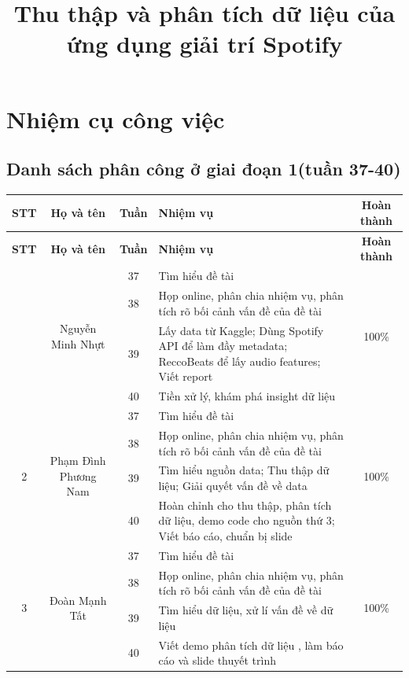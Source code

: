 \documentclass{../hcmut-report}
\title{Thu thập và phân tích dữ liệu của ứng dụng giải trí Spotify}
\begin{document}
\coverpage



\section*{Nhiệm cụ công việc}
\subsection*{Danh sách phân công ở giai đoạn 1(tuần 37-40)}
\renewcommand{\arraystretch}{1.3} %
\setlength{\tabcolsep}{8pt} %

\begin{longtable}{|c|c|c|p{5cm}|c|}
\hline
\textbf{STT} & \textbf{Họ và tên} & \textbf{Tuần} & \textbf{Nhiệm vụ} & \textbf{Hoàn thành} \\
\hline
\endfirsthead

\hline
\textbf{STT} & \textbf{Họ và tên} & \textbf{Tuần} & \textbf{Nhiệm vụ} & \textbf{Hoàn thành} \\
\hline
\endhead

\hline
\endfoot

\hline
\endlastfoot

\multirow{4}{*}{1} & \multirow{4}{*}{Nguyễn Minh Nhựt} 
    & 37 & Tìm hiểu đề tài & \multirow{4}{*}{100\%} \\ \cline{3-4}
& & 38 & Họp online, phân chia nhiệm vụ, phân tích rõ bối cảnh vấn đề của đề tài & \\ \cline{3-4}
& & 39 & Lấy data từ Kaggle; Dùng Spotify API để làm đầy metadata; ReccoBeats để lấy audio features; Viết report & \\ \cline{3-4}
& & 40 & Tiền xử lý, khám phá insight dữ liệu & \\ \hline

\multirow{4}{*}{2} & \multirow{4}{*}{Phạm Đình Phương Nam} 
    & 37 & Tìm hiểu đề tài & \multirow{4}{*}{100\%} \\ \cline{3-4}
& & 38 & Họp online, phân chia nhiệm vụ, phân tích rõ bối cảnh vấn đề của đề tài & \\ \cline{3-4}
& & 39 & Tìm hiểu nguồn data; Thu thập dữ liệu; Giải quyết vấn đề về data & \\ \cline{3-4}
& & 40 & Hoàn chỉnh cho thu thập, phân tích dữ liệu, demo code cho nguồn thứ 3; Viết báo cáo, chuẩn bị slide & \\ \hline

\multirow{4}{*}{3} & \multirow{4}{*}{Đoàn Mạnh Tất} 
    & 37 & Tìm hiểu đề tài & \multirow{4}{*}{100\%} \\ \cline{3-4}
& & 38 & Họp online, phân chia nhiệm vụ, phân tích rõ bối cảnh vấn đề của đề tài & \\ \cline{3-4}
& & 39 & Tìm hiểu dữ liệu, xử lí vấn đề về dữ liệu & \\ \cline{3-4}
& & 40 & Viết demo phân tích dữ liệu , làm báo cáo và slide thuyết trình & \\ \hline


\end{longtable}
\end{document}
